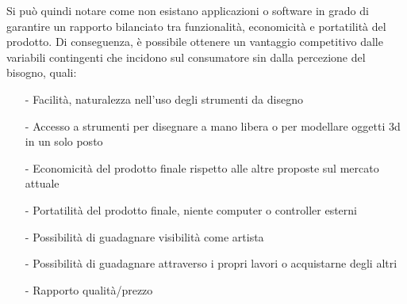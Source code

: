 \documentclass[11pt,fleqn]{book} %
\begin{document}
Si può quindi notare come non esistano applicazioni o software in grado di garantire un rapporto bilanciato tra funzionalità, economicità e portatilità del prodotto. Di conseguenza, è possibile ottenere un vantaggio competitivo dalle variabili contingenti che incidono sul consumatore sin dalla percezione del bisogno, quali:
\begin{itemize}
\item[-] Facilità, naturalezza nell'uso degli strumenti da disegno
\item[-] Accesso a strumenti per disegnare a mano libera o per modellare oggetti 3d in un solo posto
\item[-] Economicità del prodotto finale rispetto alle altre proposte sul mercato attuale
\item[-] Portatilità del prodotto finale, niente computer o controller esterni
\item[-] Possibilità di guadagnare visibilità come artista 
\item[-] Possibilità di guadagnare attraverso i propri lavori o acquistarne degli altri
\item[-] Rapporto qualità/prezzo
\end{itemize}

				
\end{document}
